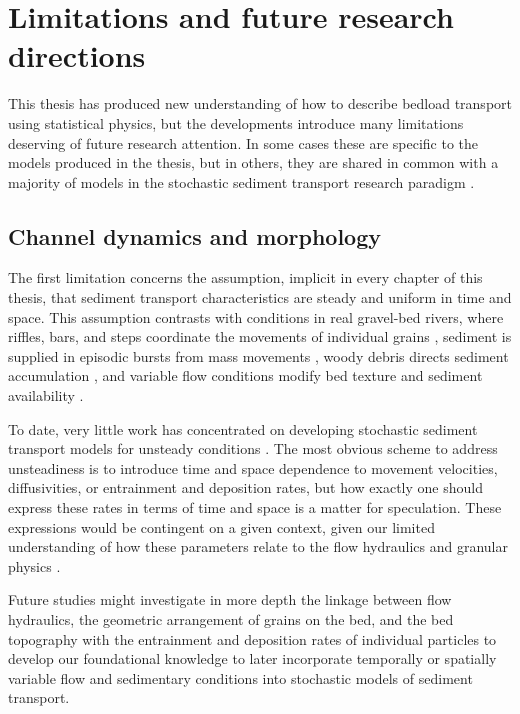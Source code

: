\section{Limitations and future research directions}

This thesis has produced new understanding of how to describe bedload transport using statistical physics, but the developments introduce many limitations deserving of future research attention.
In some cases these are specific to the models produced in the thesis, but in others, they are shared in common with a majority of models in the stochastic sediment transport research paradigm \citep{Ancey2020,Furbish2021a}.

\subsection{Channel dynamics and morphology}

The first limitation concerns the assumption, implicit in every chapter of this thesis, that sediment transport characteristics are steady and uniform in time and space.
This assumption contrasts with conditions in real gravel-bed rivers, where riffles, bars, and steps coordinate the movements of individual grains \citep{Ashmore1998,McDowell2020}, sediment is supplied in episodic bursts from mass movements \citep{Benda1990, Muller2018}, woody debris directs sediment accumulation \citep{Eaton2012,Reid2019}, and variable flow conditions modify bed texture and sediment availability \citep{Mao2012,Phillips2018}.

To date, very little work has concentrated on developing stochastic sediment transport models for unsteady conditions \citep[e.g.][]{Bohorquez2016}.
The most obvious scheme to address unsteadiness is to introduce time and space dependence to movement velocities, diffusivities, or entrainment and deposition rates, but how exactly one should express these rates in terms of time and space is a matter for speculation. These expressions would be contingent on a given context, given our limited understanding of how these parameters relate to the flow hydraulics and granular physics \citep[e.g.][]{Heyman2016}.

Future studies might investigate in more depth the linkage between flow hydraulics, the geometric arrangement of grains on the bed, and the bed topography with the entrainment and deposition rates of individual particles to develop our foundational knowledge to later incorporate temporally or spatially variable flow and sedimentary conditions into stochastic models of sediment transport.

